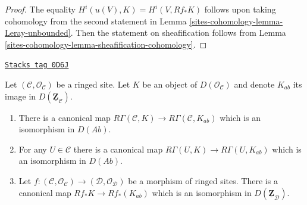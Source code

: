 \begin{proof}
The equality $H^i(u(V), K) = H^i(V, Rf_*K)$ follows upon taking
cohomology from the second statement in
Lemma \ref{sites-cohomology-lemma-Leray-unbounded}. Then the statement on sheafification
follows from Lemma \ref{sites-cohomology-lemma-sheafification-cohomology}.
\end{proof}

\begin{lemma}
\label{sites-cohomology-lemma-modules-abelian-unbounded}
\href{https://stacks.math.columbia.edu/tag/0D6J}{\texttt{Stacks tag 0D6J}}

Let $(\mathcal{C}, \mathcal{O}_\mathcal{C})$ be a ringed site.
Let $K$ be an object of $D(\mathcal{O}_\mathcal{C})$
and denote $K_{ab}$ its image in $D(\underline{\mathbf{Z}}_\mathcal{C})$.
\begin{enumerate}
\item There is a canonical map
$R\Gamma(\mathcal{C}, K) \to R\Gamma(\mathcal{C}, K_{ab})$
which is an isomorphism in $D(\textit{Ab})$.
\item For any $U \in \mathcal{C}$ there is a canonical map
$R\Gamma(U, K) \to R\Gamma(U, K_{ab})$
which is an isomorphism in $D(\textit{Ab})$.
\item Let $f : (\mathcal{C}, \mathcal{O}_\mathcal{C}) \to
(\mathcal{D}, \mathcal{O}_\mathcal{D})$ be a morphism of ringed sites.
There is a canonical map $Rf_*K \to Rf_*(K_{ab})$ which
is an isomorphism in $D(\underline{\mathbf{Z}}_\mathcal{D})$.
\end{enumerate}
\end{lemma}


